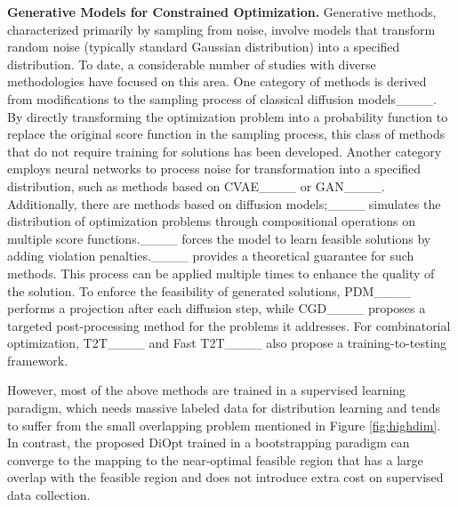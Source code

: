 \textbf{Generative Models for Constrained Optimization.} Generative methods, characterized primarily by sampling from noise, involve models that transform random noise (typically standard Gaussian distribution) into a specified distribution. To date, a considerable number of studies with diverse methodologies have focused on this area. One category of methods is derived from modifications to the sampling process of classical diffusion models____. By directly transforming the optimization problem into a probability function to replace the original score function in the sampling process, this class of methods that do not require training for solutions has been developed. Another category employs neural networks to process noise for transformation into a specified distribution, such as methods based on CVAE____ or GAN____. Additionally, there are methods based on diffusion models;____ simulates the distribution of optimization problems through compositional operations on multiple score functions.____ forces the model to learn feasible solutions by adding violation penalties.____ provides a theoretical guarantee for such methods. This process can be applied multiple times to enhance the quality of the solution. To enforce the feasibility of generated solutions, PDM____ performs a projection after each diffusion step, while CGD____ proposes a targeted post-processing method for the problems it addresses. For combinatorial optimization, T2T____ and Fast T2T____ also propose a training-to-testing framework. 

However, most of the above methods are trained in a supervised learning paradigm, which needs massive labeled data for distribution learning and tends to suffer from the small overlapping problem mentioned in Figure \ref{fig:highdim}. In contrast, the proposed DiOpt trained in a bootstrapping paradigm can converge to the mapping to the near-optimal feasible region that has a large overlap with the feasible region and does not introduce extra cost on supervised data collection.